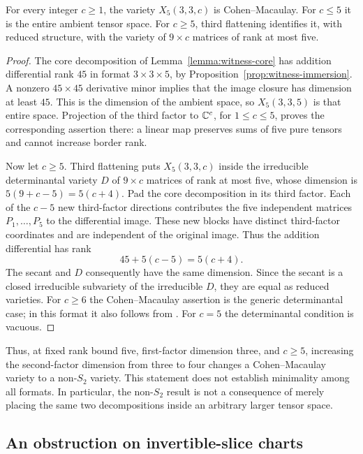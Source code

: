 \begin{proposition}\label{bound:adjacent}
For every integer $c\geq1$, the variety $X_5(3,3,c)$ is
Cohen--Macaulay. For $c\leq5$ it is the entire ambient tensor space.
For $c\geq5$, third flattening identifies it, with reduced structure,
with the variety of $9\times c$ matrices of rank at most five.
\end{proposition}

\begin{proof}
The core decomposition of Lemma~\ref{lemma:witness-core} has addition
differential rank $45$ in format $3\times3\times5$, by
Proposition~\ref{prop:witness-immersion}. A nonzero $45\times45$
derivative minor implies that the image closure has dimension at
least $45$. This is the dimension of the ambient space, so
$X_5(3,3,5)$ is that entire space. Projection of the third factor to
$\mathbb C^c$, for $1\leq c\leq5$, proves the corresponding assertion there:
a linear map preserves sums of five pure tensors and cannot increase
border rank.

Now let $c\geq5$. Third flattening puts $X_5(3,3,c)$ inside the
irreducible determinantal variety $D$ of $9\times c$ matrices of
rank at most five, whose dimension is $5(9+c-5)=5(c+4)$.
Pad the core decomposition in its third factor. Each of the $c-5$
new third-factor directions contributes the five independent matrices
$P_1,\ldots,P_5$ to the differential image. These new blocks have
distinct third-factor coordinates and are independent of the original
image. Thus the addition differential has rank
\[
 45+5(c-5)=5(c+4).
\]
The secant and $D$ consequently have the same dimension. Since the
secant is a closed irreducible subvariety of the irreducible $D$,
they are equal as reduced varieties. For $c\geq6$ the
Cohen--Macaulay assertion is the generic determinantal case; in this
format it also follows from
\cite[Theorem~2.4]{CatalisanoGeramitaGimigliano2008}.
For $c=5$ the determinantal condition is vacuous.
\end{proof}

Thus, at fixed rank bound five, first-factor dimension three, and
$c\geq5$, increasing the second-factor dimension from three to four
changes a Cohen--Macaulay variety to a non-$S_2$ variety. This statement
does not establish minimality among all formats. In particular, the
non-$S_2$ result is not a consequence of merely placing the same two
decompositions inside an arbitrary larger tensor space.

\subsection{An obstruction on invertible-slice charts}\label{bound:slice-subsection}

